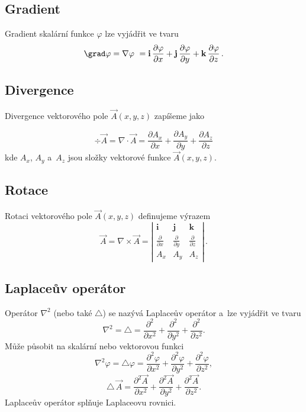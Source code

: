 \subsection*{Gradient}

Gradient skalární funkce $\varphi$ lze vyjádřit ve tvaru
$$
\grad \varphi = \nabla\varphi\ = \mathbf{i}\,\frac{\partial \varphi}{\partial x} + \mathbf{j}\,\frac{\partial \varphi}{\partial y} + \mathbf{k}\,\frac{\partial \varphi}{\partial z}\,.
$$

\subsection*{Divergence}

Divergence vektorového pole $\vec A(x, y, z)$ zapíšeme jako

$$
\div \vec A = \nabla \cdot \vec A = \frac{\partial A_x}{\partial x} + \frac{\partial A_y}{\partial y} + \frac{\partial A_z}{\partial z}
$$
kde $A_x$, $A_y$ a~$A_z$ jsou složky vektorové funkce $\vec A(x, y, z)$.

\subsection*{Rotace}

Rotaci vektorového pole $\vec A(x, y, z)$ definujeme výrazem
$$
\vec A = \nabla \times \vec A = 
\left|
\begin{array}{ccc}
  \mathbf{i} & \mathbf{j} & \mathbf{k} \\
  \frac{\partial}{\partial x} & \frac{\partial}{\partial y} & \frac{\partial}{\partial z} \\
  A_x & A_y & A_z
\end{array}
\right|\,.
$$

\subsection*{Laplaceův operátor}

Operátor $\nabla^2$ (nebo také $\triangle$) se nazývá Laplaceův operátor a~lze vyjádřit ve tvaru
$$
\nabla^2 = \triangle = \frac{\partial^2}{\partial x^2}+\frac{\partial^2}{\partial y^2}+
\frac{\partial^2}{\partial z^2}.
$$
Může působit na skalární nebo vektorovou funkci
$$
\nabla^2 \varphi = \triangle \varphi = \frac{\partial^2\varphi}{\partial x^2}+\frac{\partial^2\varphi}{\partial y^2}+
\frac{\partial^2\varphi}{\partial z^2},
$$
$$
\triangle\, \vec A = \frac{\partial^2 \vec A}{\partial x^2} + \frac{\partial^2 \vec A}{\partial y^2} + 
\frac{\partial^2 \vec A}{\partial z^2}.
$$
Laplaceův operátor splňuje Laplaceovu rovnici. 

